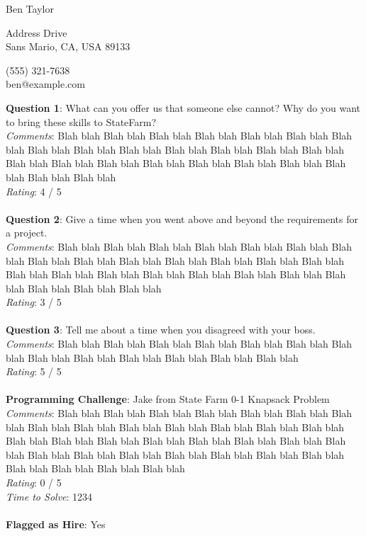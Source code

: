 \documentclass[12pt]{article}
\begin{document}
{\LARGE \begin{center}Ben Taylor\end{center}}

\begin{multicols}{2}
 Address Drive \\
Sans Mario, CA, USA 89133
\columnbreak

\noindent
(555) 321-7638 \\
ben@example.com
\end{multicols}

\noindent
\textbf{Question 1}: What can you offer us that someone else cannot? Why do you want to bring these skills to StateFarm?
\\\noindent
\textit{Comments}: Blah blah Blah blah Blah blah Blah blah Blah blah Blah blah Blah blah Blah blah Blah blah Blah blah Blah blah Blah blah Blah blah Blah blah Blah blah Blah blah Blah blah Blah blah Blah blah Blah blah Blah blah Blah blah Blah blah Blah blah 
\\\noindent
\textit{Rating}: 4 / 5
\\\\
\noindent
\textbf{Question 2}: Give a time when you went above and beyond the requirements for a project.
\\\noindent
\textit{Comments}: Blah blah Blah blah Blah blah Blah blah Blah blah Blah blah Blah blah Blah blah Blah blah Blah blah Blah blah Blah blah Blah blah Blah blah Blah blah Blah blah Blah blah Blah blah Blah blah Blah blah Blah blah Blah blah Blah blah Blah blah Blah blah 
\\\noindent
\textit{Rating}: 3 / 5
\\\\
\noindent
\textbf{Question 3}: Tell me about a time when you disagreed with your boss.
\\\noindent
\textit{Comments}: Blah blah Blah blah Blah blah Blah blah Blah blah Blah blah Blah blah Blah blah Blah blah Blah blah Blah blah Blah blah Blah blah 
\\\noindent
\textit{Rating}: 5 / 5
\\\\
\noindent
\textbf{Programming Challenge}: Jake from State Farm 0-1 Knapsack Problem
\\\noindent
\textit{Comments}: Blah blah Blah blah Blah blah Blah blah Blah blah Blah blah Blah blah Blah blah Blah blah Blah blah Blah blah Blah blah Blah blah Blah blah Blah blah Blah blah Blah blah Blah blah Blah blah Blah blah Blah blah Blah blah Blah blah Blah blah Blah blah Blah blah Blah blah Blah blah Blah blah Blah blah Blah blah Blah blah Blah blah 
\\\noindent
\textit{Rating}: 0 / 5
\\\noindent
\textit{Time to Solve}: 1234
\\\\
\textbf{Flagged as Hire}: Yes
\\\\ 
\end{document}
